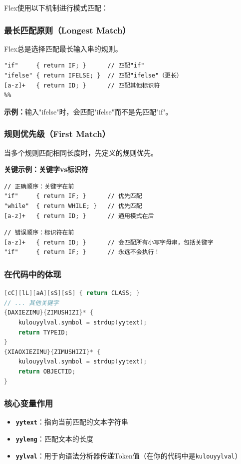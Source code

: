 \documentclass[twocolumn]{article}
\begin{document}
Flex使用以下机制进行模式匹配：

\subsubsection{最长匹配原则（Longest Match）}
Flex总是选择匹配最长输入串的规则。

\begin{lstlisting}[language=Flex, caption={最长匹配原则示例}]
%%
"if"     { return IF; }      // 匹配"if"
"ifelse" { return IFELSE; }  // 匹配"ifelse"（更长）
[a-z]+   { return ID; }      // 匹配其他标识符
%%
\end{lstlisting}

\textbf{示例：}输入"ifelse"时，会匹配"ifelse"而不是先匹配"if"。

\subsubsection{规则优先级（First Match）}
当多个规则匹配相同长度时，先定义的规则优先。

\textbf{关键示例：关键字vs标识符}

\begin{lstlisting}[language=Flex, caption={正确的规则顺序}]
// 正确顺序：关键字在前
"if"     { return IF; }      // 优先匹配
"while"  { return WHILE; }   // 优先匹配  
[a-z]+   { return ID; }      // 通用模式在后
\end{lstlisting}

\begin{lstlisting}[language=Flex, caption={错误的规则顺序}]
// 错误顺序：标识符在前
[a-z]+   { return ID; }      // 会匹配所有小写字母串，包括关键字
"if"     { return IF; }      // 永远不会执行！
\end{lstlisting}

\subsubsection{在代码中的体现}
\begin{lstlisting}[language=C++, caption={你代码中的模式匹配实现}]
[cC][lL][aA][sS][sS] { return CLASS; }
// ... 其他关键字
{DAXIEZIMU}{ZIMUSHIZI}* { 
    kulouyylval.symbol = strdup(yytext);
    return TYPEID;
}
{XIAOXIEZIMU}{ZIMUSHIZI}* { 
    kulouyylval.symbol = strdup(yytext);
    return OBJECTID;
}
\end{lstlisting}

\subsubsection{核心变量作用}
\begin{itemize}
    \item \textbf{\texttt{yytext}}：指向当前匹配的文本字符串
    \item \textbf{\texttt{yyleng}}：匹配文本的长度
    \item \textbf{\texttt{yylval}}：用于向语法分析器传递Token值（在你的代码中是\texttt{kulouyylval}）
\end{itemize}
\end{document}
